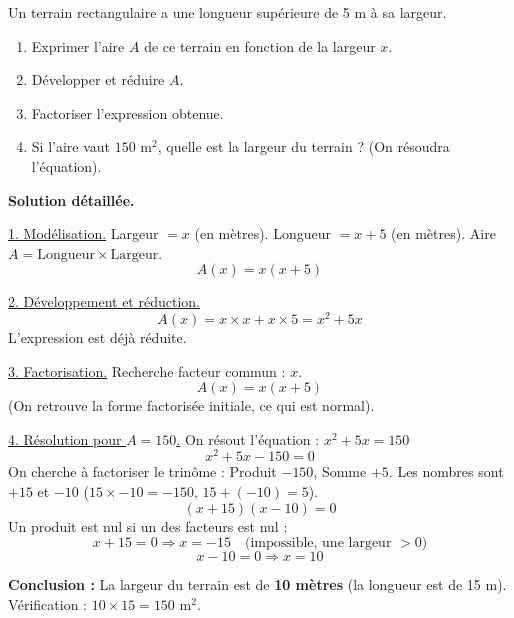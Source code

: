 \documentclass[11pt]{article}
\begin{document}
\begin{exoresolu}
Un terrain rectangulaire a une longueur supérieure de 5 m à sa largeur.
\begin{enumerate}
    \item Exprimer l'aire $A$ de ce terrain en fonction de la largeur $x$.
    \item Développer et réduire $A$.
    \item Factoriser l'expression obtenue.
    \item Si l'aire vaut $150 \text{ m}^2$, quelle est la largeur du terrain ? (On résoudra l'équation).
\end{enumerate}
\tcblower
\textbf{Solution détaillée.}

\underline{1. Modélisation.}
Largeur $= x$ (en mètres).
Longueur $= x + 5$ (en mètres).
Aire $A = \text{Longueur} \times \text{Largeur}$.
\[ A(x) = x(x + 5) \]

\underline{2. Développement et réduction.}
\[ A(x) = x \times x + x \times 5 = x^2 + 5x \]
L'expression est déjà réduite.

\underline{3. Factorisation.}
Recherche facteur commun : $x$.
\[ A(x) = x(x + 5) \]
(On retrouve la forme factorisée initiale, ce qui est normal).

\underline{4. Résolution pour $A = 150$.}
On résout l'équation : $x^2 + 5x = 150$
\[ x^2 + 5x - 150 = 0 \]
On cherche à factoriser le trinôme : Produit $-150$, Somme $+5$.
Les nombres sont $+15$ et $-10$ ($15 \times -10 = -150$, $15 + (-10) = 5$).
\[ (x + 15)(x - 10) = 0 \]
Un produit est nul si un des facteurs est nul :
\[ x + 15 = 0 \Rightarrow x = -15 \quad \text{(impossible, une largeur $>0$)} \]
\[ x - 10 = 0 \Rightarrow x = 10 \]

\textbf{Conclusion :} La largeur du terrain est de \textbf{10 mètres} (la longueur est de 15 m). Vérification : $10 \times 15 = 150 \text{ m}^2$.
\end{exoresolu}
\end{document}
